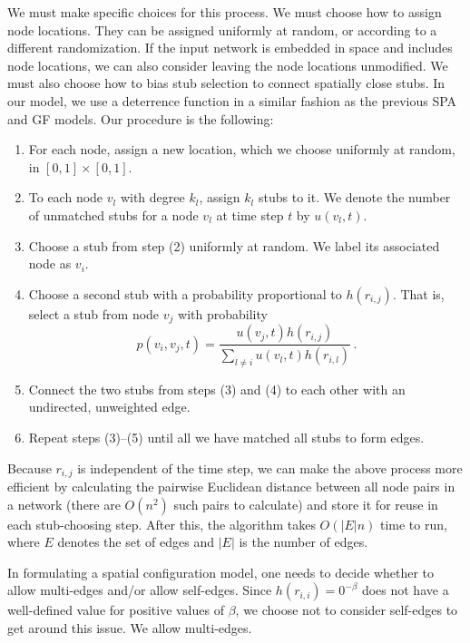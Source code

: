 \documentclass[%
 reprint,
 amsmath,amssymb,
 aps,
]{revtex4-1}
\begin{document}
{\color{red}We must make specific choices for this process. We must choose how to assign node locations. They can be assigned uniformly at random, or according to a different randomization. If the input network is embedded in space and includes node locations, we can also consider leaving the node locations unmodified. We must also choose how to bias stub selection to connect spatially close stubs. In our model, we use a deterrence function in a similar fashion as the previous SPA and GF models. }Our procedure is the following:
\begin{enumerate}
    \item For each node, assign a new location, which we choose uniformly at random, in $[0, 1] \times [0, 1]$.
    \item To each node $v_l$ with degree $k_l$, assign $k_l$ stubs to it. We denote the number of unmatched stubs for a node $v_l$ at time step $t$ by $u(v_l, t)$.
    \item Choose a stub from step (2) uniformly at random. We label its associated node as $v_i$.
    \item Choose a second stub with a probability proportional to $h(r_{i,j})$. That is, select a stub from node $v_j$ with probability
   \begin{equation*}
        p(v_i, v_j, t) = \frac{u(v_j, t)h(r_{i,j})}{\sum_{l \neq i} u(v_l, t)h(r_{i,l})} \,.
    \end{equation*}
    \item Connect the two stubs from steps (3) and (4) to each other with an undirected, unweighted edge. 
    \item Repeat steps (3)--(5) until all we have matched all stubs to form edges.
\end{enumerate}

Because $r_{i,j}$ is independent of the time step, we can make the above process more efficient by calculating the pairwise Euclidean distance between all node pairs in a network (there are $O(n^2)$ such pairs to calculate) and store it for reuse in each stub-choosing step. After this, the algorithm takes $O(|E| n)$ time to run, where $E$ denotes the set of edges and $|E|$ is the number of edges.

In formulating a spatial configuration model, one needs to decide whether to allow multi-edges and/or allow self-edges. {\color{red}Since $h(r_{i,i}) = 0^{-\beta}$ does not have a well-defined value for positive values of $\beta$, we choose not to consider self-edges to get around this issue. We allow multi-edges.}
\end{document}
